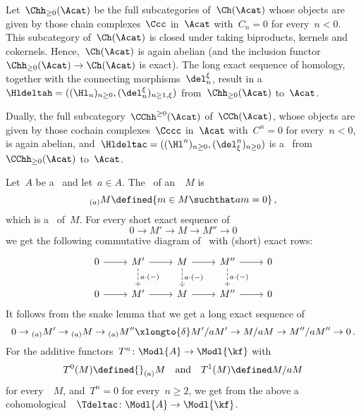 \begin{example}
  Let~$\Chh_{\geq 0}(\Acat)$ be the full subcategories of~$\Ch(\Acat)$ whose objects are given by those chain complexes~$\Ccc$ in~$\Acat$ with~$C_n = 0$ for every~$n < 0$.
  This subcategory of~$\Ch(\Acat)$ is closed under taking biproducts, kernels and cokernels.
  Hence,~$\Ch(\Acat)$ is again abelian (and the inclusion functor~$\Chh_{\geq 0}(\Acat) \to \Ch(\Acat)$ is exact).
  The long exact sequence of homology, together with the connecting morphisms~$\del^\xi_n$, result in a~{\deltafun}~$\Hldeltah = ((\Hl_n)_{n \geq 0}, (\del^\xi_n)_{n \geq 1, \xi})$ from~$\Chh_{\geq 0}(\Acat)$ to~$\Acat$.
  
  Dually, the full subcategory~$\CChh^{\geq 0}(\Acat)$ of~$\CCh(\Acat)$, whose objects are given by those cochain complexes~$\Cccc$ in~$\Acat$ with~$C^n = 0$ for every~$n < 0$, is again abelian, and~$\Hldeltac = ((\Hl^n)_{n \geq 0}, (\del_\xi^n)_{n \geq 0})$ is a~{\deltafun} from~$\CChh_{\geq 0}(\Acat)$ to~$\Acat$.
\end{example}


\begin{example}
  Let~$A$ be a~{\kalg} and let~$a \in A$.
  The~\emph{} of an~{}~$M$ is
  \[
              {}_{(a)} M
    \defined  \{
                m \in M
              \suchthat
                am = 0
              \} \,,
  \]
  which is a~{\submodule{$\kf$}} of~$M$.
  For every short exact sequence of~{}
  \[
    0
    \to
    M'
    \to
    M
    \to
    M''
    \to
    0
  \]
  we get the following commutative diagram of~{\modules{$\kf$}} with (short) exact rows:
  \[
    \begin{tikzcd}
        0
        \arrow{r}
      & M'
        \arrow{r}
        \arrow[dashed]{d}[right]{a \cdot (-)}
      & M
        \arrow{r}
        \arrow[dashed]{d}[right]{a \cdot (-)}
      & M''
        \arrow{r}
        \arrow[dashed]{d}[right]{a \cdot (-)}
      & 0
      \\
        0
        \arrow{r}
      & M'
        \arrow{r}
      & M
        \arrow{r}
      & M''
        \arrow{r}
      & 0
    \end{tikzcd}
  \]
  It follows from the snake lemma that we get a long exact sequence of~{\modules{$\kf$}}
  \[
    0
    \to
    {}_{(a)} M'
    \to
    {}_{(a)} M
    \to
    {}_{(a)} M''
    \xlongto{\delta}
    M'/aM'
    \to
    M/aM
    \to
    M''/aM''
    \to
    0 \,.
  \]
  For the additive functors~$T^n \colon \Modl{A} \to \Modl{\kf}$ with
  \[
              T^0(M)
    \defined  {}_{(a)} M
    \quad\text{and}\quad
              T^1(M)
    \defined  M/aM
  \]
  for every~{}~$M$, and~$T^n = 0$ for every~$n \geq 2$, we get from the above a cohomological~{\deltafun}~$\Tdeltac \colon \Modl{A} \to \Modl{\kf}$.
\end{example}


